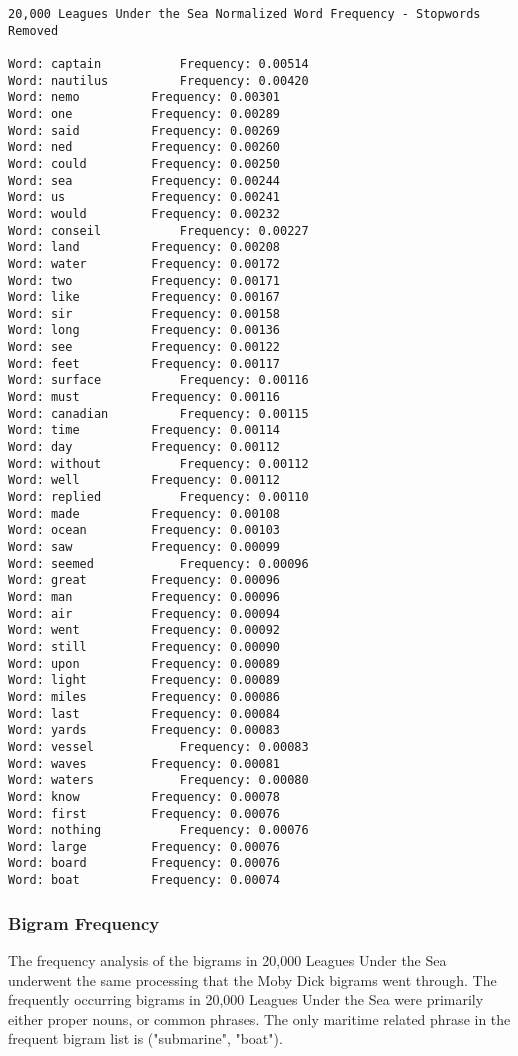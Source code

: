 \documentclass[11pt]{article}
\begin{document}
    \begin{Verbatim}[commandchars=\\\{\}]
20,000 Leagues Under the Sea Normalized Word Frequency - Stopwords Removed

Word: captain        	Frequency: 0.00514
Word: nautilus        	Frequency: 0.00420
Word: nemo        	Frequency: 0.00301
Word: one        	Frequency: 0.00289
Word: said        	Frequency: 0.00269
Word: ned        	Frequency: 0.00260
Word: could        	Frequency: 0.00250
Word: sea        	Frequency: 0.00244
Word: us        	Frequency: 0.00241
Word: would        	Frequency: 0.00232
Word: conseil        	Frequency: 0.00227
Word: land        	Frequency: 0.00208
Word: water        	Frequency: 0.00172
Word: two        	Frequency: 0.00171
Word: like        	Frequency: 0.00167
Word: sir        	Frequency: 0.00158
Word: long        	Frequency: 0.00136
Word: see        	Frequency: 0.00122
Word: feet        	Frequency: 0.00117
Word: surface        	Frequency: 0.00116
Word: must        	Frequency: 0.00116
Word: canadian        	Frequency: 0.00115
Word: time        	Frequency: 0.00114
Word: day        	Frequency: 0.00112
Word: without        	Frequency: 0.00112
Word: well        	Frequency: 0.00112
Word: replied        	Frequency: 0.00110
Word: made        	Frequency: 0.00108
Word: ocean        	Frequency: 0.00103
Word: saw        	Frequency: 0.00099
Word: seemed        	Frequency: 0.00096
Word: great        	Frequency: 0.00096
Word: man        	Frequency: 0.00096
Word: air        	Frequency: 0.00094
Word: went        	Frequency: 0.00092
Word: still        	Frequency: 0.00090
Word: upon        	Frequency: 0.00089
Word: light        	Frequency: 0.00089
Word: miles        	Frequency: 0.00086
Word: last        	Frequency: 0.00084
Word: yards        	Frequency: 0.00083
Word: vessel        	Frequency: 0.00083
Word: waves        	Frequency: 0.00081
Word: waters        	Frequency: 0.00080
Word: know        	Frequency: 0.00078
Word: first        	Frequency: 0.00076
Word: nothing        	Frequency: 0.00076
Word: large        	Frequency: 0.00076
Word: board        	Frequency: 0.00076
Word: boat        	Frequency: 0.00074

    \end{Verbatim}

    \subsubsection{Bigram Frequency}\label{bigram-frequency}

The frequency analysis of the bigrams in 20,000 Leagues Under the Sea
underwent the same processing that the Moby Dick bigrams went through.
The frequently occurring bigrams in 20,000 Leagues Under the Sea were
primarily either proper nouns, or common phrases. The only maritime
related phrase in the frequent bigram list is ("submarine", "boat").
\end{document}
